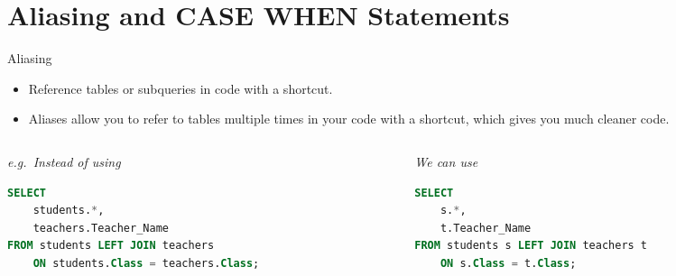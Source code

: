 \documentclass{beamer}
\begin{document}
\section{Aliasing and CASE WHEN Statements}

\sectionframe

\begin{frame}[fragile]{Aliasing}
\begin{itemize}
  \item Reference tables or subqueries in code with a shortcut.
  \item Aliases allow you to refer to tables multiple times in your code with a
        shortcut, which gives you much cleaner code.
\end{itemize}
\begin{columns}[T]
\begin{column}{0.48\textwidth}
\textit{e.g.\ Instead of using}
\begin{lstlisting}[language=SQL,basicstyle=\ttfamily\tiny]
SELECT
    students.*,
    teachers.Teacher_Name
FROM students LEFT JOIN teachers
    ON students.Class = teachers.Class;
\end{lstlisting}
\end{column}
\begin{column}{0.48\textwidth}
\textit{We can use}
\begin{lstlisting}[language=SQL,basicstyle=\ttfamily\tiny]
SELECT
    s.*,
    t.Teacher_Name
FROM students s LEFT JOIN teachers t
    ON s.Class = t.Class;
\end{lstlisting}
\end{column}
\end{columns}
\end{frame}
\end{document}
